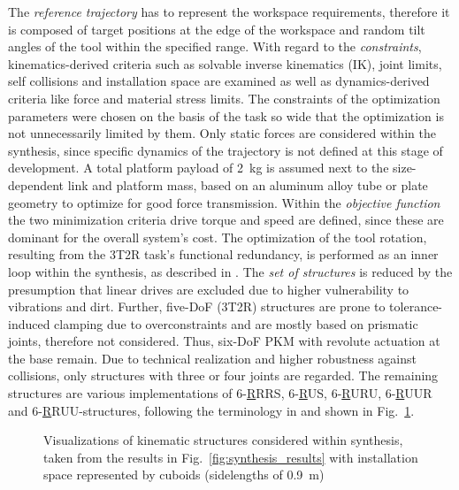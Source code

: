 \documentclass[runningheads,hidelinks]{llncs}
\begin{document}
The \emph{reference trajectory} has to represent the workspace requirements, therefore it is composed of target positions at the edge of the workspace and random tilt angles of the tool within the specified range. 
With regard to the \emph{constraints}, kinematics-derived criteria such as solvable inverse kinematics (IK), joint limits, self collisions and installation space are examined as well as dynamics-derived criteria like force and material stress limits. %
The constraints of the optimization parameters were chosen on the basis of the task so wide that the optimization is not unnecessarily limited by them. 
Only static forces are considered within the synthesis, since specific dynamics of the trajectory is not defined at this stage of development.  
A total platform payload of \SI{2}{\kilo\gram} is assumed next to the size-dependent link and platform mass, based on an aluminum alloy tube or plate geometry to optimize for good force transmission.
Within the \emph{objective function} the two minimization criteria drive torque and speed are defined, since these are dominant for the overall system's cost. 
The optimization of the tool rotation, resulting from the 3T2R task's functional redundancy, is performed as an inner loop within the synthesis, as described in \cite{Schappler2022_ARK_3T1R}.
The \emph{set of structures} is reduced by the presumption that linear drives are excluded due to higher vulnerability to vibrations and dirt. 
Further, five-DoF (3T2R) structures are prone to tolerance-induced clamping due to overconstraints and are mostly based on prismatic joints, therefore not considered.
Thus, six-DoF PKM with revolute actuation at the base remain. %
Due to technical realization and higher robustness against collisions, only structures with three or four joints are regarded. 
The remaining structures are various implementations of 6-\underline{R}RRS, 6-\underline{R}US, 6-\underline{R}URU, 6-\underline{R}UUR and 6-\underline{R}RUU-structures, following the terminology in \cite{Merlet2006} and shown in Fig.~\ref{fig:robots}. 
% 
\begin{figure}[tb]
	\centering
	
	\caption{Visualizations of kinematic structures considered within synthesis, taken from the results in Fig.~\ref{fig:synthesis_results} with installation space represented by cuboids (sidelengths of \SI{0.9}{\metre})}
	\label{fig:robots}
	\vspace{-5mm}
\end{figure}
\end{document}
